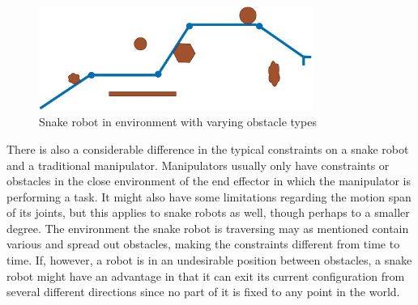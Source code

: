 \begin{figure}
    \centering
    \includegraphics[width=0.8\textwidth]{figures/theory/weird-environment.pdf}
    \caption{Snake robot in environment with varying obstacle types}
    \label{fig:weird-env}
\end{figure}

There is also a considerable difference in the typical constraints on a snake robot and a traditional manipulator. Manipulators usually only have constraints or obstacles in the close environment of the end effector in which the manipulator is performing a task. It might also have some limitations regarding the motion span of its joints, but this applies to snake robots as well, though perhaps to a smaller degree. The environment the snake robot is traversing may as mentioned contain various and spread out obstacles, making the constraints different from time to time. If, however, a robot is in an undesirable position between obstacles, a snake robot might have an advantage in that it can exit its current configuration from several different directions since no part of it is fixed to any point in the world.


